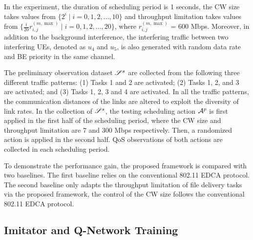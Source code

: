 In the experiment, the duration of scheduling period is 1 seconds, the CW size takes values from $\{2^{i} \mid i = 0,1,2,\dots,10\}$ and throughput limitation takes values from $\{ \frac{i}{20} r_{i,j}^{({m},\max)} \mid i =0,1,2,\dots,20\}$, where $r_{i,j}^{({m},\max)}$ = 600 Mbps. Moreover, in addition to the background interference, the interfering traffic between two interfering UEs, denoted as $u_4$ and $u_5$, 
is also generated with random data rate and BE priority in the same channel. 

The preliminary observation dataset $\mathscr{S}^{s}$ are collected from the following three different traffic patterns: (1) Tasks 1 and 2 are activated; (2) Tasks 1, 2, and 3 are activated; and (3) Tasks 1, 2, 3 and 4 are activated. In all the traffic patterns, the communication distances of the links are altered to exploit the diversity of link rates. In the collection of  $\mathscr{S}^{s}$, the testing scheduling action $\mathcal{A}^p$ is first applied in the first half of the scheduling period, where the CW size and throughput limitation are $7$ and $300$ Mbps respectively. Then, a randomized action is applied in the second half. QoS observations of both actions are collected in each scheduling period. 

To demonstrate the performance gain, the proposed framework is compared with two baselines. The first baseline relies on the conventional 802.11 EDCA protocol. The second baseline only adapts the throughput limitation of file delivery tasks via the proposed framework, the control of the CW size follows the conventional 802.11 EDCA protocol.

\subsection{Imitator and Q-Network Training}

